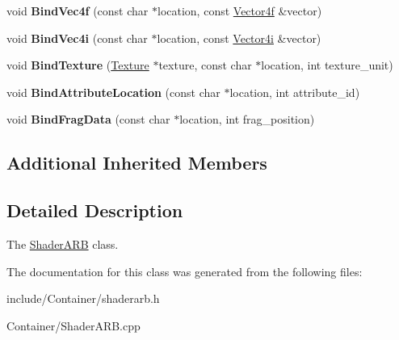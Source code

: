 \begin{DoxyCompactItemize}
\item 
\hypertarget{classEngine_1_1ShaderARB_aaeafcdfa69b123c0f9b102b8f6c3b84e}{}void {\bfseries Bind\+Vec4f} (const char $\ast$location, const \hyperlink{classVector4}{Vector4f} \&vector)\label{classEngine_1_1ShaderARB_aaeafcdfa69b123c0f9b102b8f6c3b84e}

\item 
\hypertarget{classEngine_1_1ShaderARB_a02d657c199f2234b3d159ea117869b9d}{}void {\bfseries Bind\+Vec4i} (const char $\ast$location, const \hyperlink{classVector4}{Vector4i} \&vector)\label{classEngine_1_1ShaderARB_a02d657c199f2234b3d159ea117869b9d}

\item 
\hypertarget{classEngine_1_1ShaderARB_a8cca6a5db67fef72017c997a183f0aa7}{}void {\bfseries Bind\+Texture} (\hyperlink{classEngine_1_1Texture}{Texture} $\ast$texture, const char $\ast$location, int texture\+\_\+unit)\label{classEngine_1_1ShaderARB_a8cca6a5db67fef72017c997a183f0aa7}

\item 
\hypertarget{classEngine_1_1ShaderARB_a74be172310f19f7c243c6a0eab53bb9b}{}void {\bfseries Bind\+Attribute\+Location} (const char $\ast$location, int attribute\+\_\+id)\label{classEngine_1_1ShaderARB_a74be172310f19f7c243c6a0eab53bb9b}

\item 
\hypertarget{classEngine_1_1ShaderARB_a98f13df024cd7ab779fdc9c1c6e1267a}{}void {\bfseries Bind\+Frag\+Data} (const char $\ast$location, int frag\+\_\+position)\label{classEngine_1_1ShaderARB_a98f13df024cd7ab779fdc9c1c6e1267a}

\end{DoxyCompactItemize}
\subsection*{Additional Inherited Members}


\subsection{Detailed Description}
The \hyperlink{classEngine_1_1ShaderARB}{Shader\+A\+R\+B} class. 

The documentation for this class was generated from the following files\+:\begin{DoxyCompactItemize}
\item 
include/\+Container/shaderarb.\+h\item 
Container/Shader\+A\+R\+B.\+cpp\end{DoxyCompactItemize}

